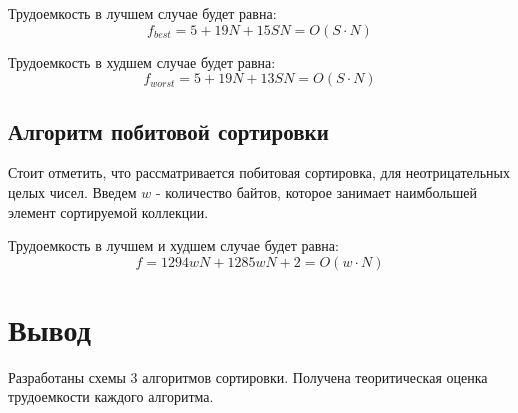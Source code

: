 Трудоемкость в лучшем случае будет равна:
\begin{equation}
    \label{for:beads_1}
    f_{best} = 5 + 19N + 15SN = O(S \cdot N)
\end{equation}

Трудоемкость в худшем случае будет равна:
\begin{equation}
    \label{for:beads_2}
    f_{worst} = 5 + 19N + 13SN = O(S \cdot N)
\end{equation}

\subsection{Алгоритм побитовой сортировки}


Стоит отметить, что рассматривается побитовая сортировка, для
неотрицательных целых чисел. Введем $w$ - количество байтов,
которое занимает наимбольшей элемент сортируемой коллекции.


Трудоемкость в лучшем и худшем случае будет равна:
\begin{equation}
    \label{for:beads_1}
    f = 1294 wN + 1285wN + 2 = O(w \cdot N)
\end{equation}

\section*{Вывод}

Разработаны схемы 3 алгоритмов сортировки. Получена теоритическая оценка
трудоемкости каждого алгоритма.
